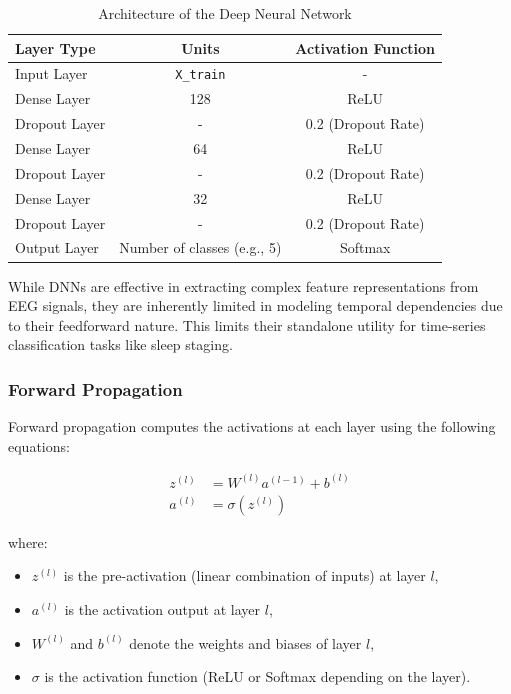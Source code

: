 \begin{table}[H]
	\centering
	\caption{Architecture of the Deep Neural Network}
	\label{tab:nn_architecture}
	\begin{tabular}{lcc}
		\hline
		\textbf{Layer Type} & \textbf{Units} & \textbf{Activation Function} \\
		\hline
		Input Layer         & \texttt{X\_train}          & - \\
		Dense Layer         & 128                        & ReLU \\
		Dropout Layer       & -                          & 0.2 (Dropout Rate) \\
		Dense Layer         & 64                         & ReLU \\
		Dropout Layer       & -                          & 0.2 (Dropout Rate) \\
		Dense Layer         & 32                         & ReLU \\
		Dropout Layer       & -                          & 0.2 (Dropout Rate) \\
		Output Layer        & Number of classes (e.g., 5) & Softmax \\
		\hline
	\end{tabular}
\end{table}

While DNNs are effective in extracting complex feature representations from EEG signals, they are inherently limited in modeling temporal dependencies due to their feedforward nature. This limits their standalone utility for time-series classification tasks like sleep staging.

\subsubsection{Forward Propagation}

Forward propagation computes the activations at each layer using the following equations:

\begin{align}
	z^{(l)} &= W^{(l)} a^{(l-1)} + b^{(l)} \\
	a^{(l)} &= \sigma(z^{(l)})
\end{align}

\noindent where:
\begin{itemize}
	\item \( z^{(l)} \) is the pre-activation (linear combination of inputs) at layer \( l \),
	\item \( a^{(l)} \) is the activation output at layer \( l \),
	\item \( W^{(l)} \) and \( b^{(l)} \) denote the weights and biases of layer \( l \),
	\item \( \sigma \) is the activation function (ReLU or Softmax depending on the layer).
\end{itemize}

